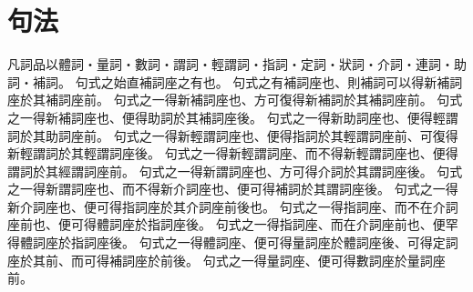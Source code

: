 \chapter{句法}
凡詞品以體詞・量詞・數詞・謂詞・輕謂詞・指詞・定詞・狀詞・介詞・連詞・助詞・補詞。
句式之始直補詞座之有也。
句式之有補詞座也、則補詞可以得新補詞座於其補詞座前。
句式之一得新補詞座也、方可復得新補詞於其補詞座前。
句式之一得新補詞座也、便得助詞於其補詞座後。
句式之一得新助詞座也、便得輕謂詞於其助詞座前。
句式之一得新輕謂詞座也、便得指詞於其輕謂詞座前、可復得新輕謂詞於其輕謂詞座後。
句式之一得新輕謂詞座、而不得新輕謂詞座也、便得謂詞於其經謂詞座前。
句式之一得新謂詞座也、方可得介詞於其謂詞座後。
句式之一得新謂詞座也、而不得新介詞座也、便可得補詞於其謂詞座後。
句式之一得新介詞座也、便可得指詞座於其介詞座前後也。
句式之一得指詞座、而不在介詞座前也、便可得體詞座於指詞座後。
句式之一得指詞座、而在介詞座前也、便罕得體詞座於指詞座後。
句式之一得體詞座、便可得量詞座於體詞座後、可得定詞座於其前、而可得補詞座於前後。
句式之一得量詞座、便可得數詞座於量詞座前。
